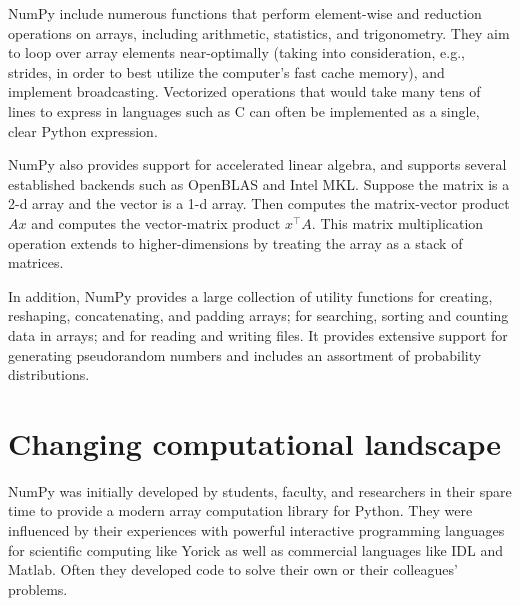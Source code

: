 NumPy include numerous functions that perform element-wise and reduction
operations on arrays, including arithmetic, statistics, and trigonometry.
They aim to loop over array elements near-optimally (taking into consideration,
e.g., strides, in order to best utilize the computer's fast cache memory), and
implement broadcasting.
Vectorized operations that would take many tens of lines to express in
languages such as C can often be implemented as a single, clear Python
expression.

NumPy also provides support for accelerated linear algebra, and supports
several established backends such as OpenBLAS and Intel MKL.
Suppose the matrix  is a 2-d array and the vector  is a 1-d array.
Then  computes the matrix-vector product $Ax$ and  computes
the vector-matrix product $x^\top A$.
This matrix multiplication operation extends to higher-dimensions by treating
the array as a stack of matrices.

In addition, NumPy provides a large collection of utility functions for
creating, reshaping, concatenating, and padding arrays; for searching, sorting
and counting data in arrays; and for reading and writing files.
It provides extensive support for generating pseudorandom numbers and includes
an assortment of probability distributions.


\section*{Changing computational landscape}



NumPy was initially developed by students, faculty, and researchers in their
spare time to provide a modern array computation library for Python.
They were influenced by their experiences with powerful interactive programming
languages for scientific computing like Yorick \cite{munro1995using} as well
as commercial languages like IDL and Matlab.
Often they developed code to solve their own or their colleagues' problems.

